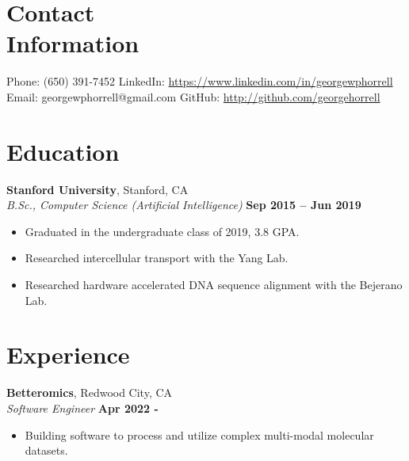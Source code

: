 \documentclass[margin,line]{resume}
\begin{document}
\begin{resume}
    \section{\mysidestyle Contact\\Information}

    Phone: (650) 391-7452       \hfill LinkedIn: \url{https://www.linkedin.com/in/georgewphorrell} \\
    \noindent Email: georgewphorrell@gmail.com  \hfill GitHub: \url{http://github.com/georgehorrell} \vspace{0mm}\\\vspace{-4.5mm}

    \section{\mysidestyle Education}

    \textbf{Stanford University}, Stanford, CA \vspace{1mm}\\\vspace{1mm}%
    \textsl{B.Sc., Computer Science (Artificial Intelligence)} \hfill \textbf{Sep 2015 -- Jun 2019}
    \begin{itemize}
        \item Graduated in the undergraduate class of 2019, 3.8 GPA. 
        \item Researched intercellular transport with the Yang Lab.
	\item Researched hardware accelerated DNA sequence alignment with the Bejerano Lab.
    \end{itemize}

    \section{\mysidestyle Experience}

    \textbf{Betteromics}, Redwood City, CA \vspace{1mm} \\\vspace{1mm}%
    \textsl{Software Engineer} \hfill \textbf{Apr 2022 -}
    \begin{itemize}
        \item Building software to process and utilize complex multi-modal molecular datasets.
    \end{itemize}


\end{resume}
\end{document}
